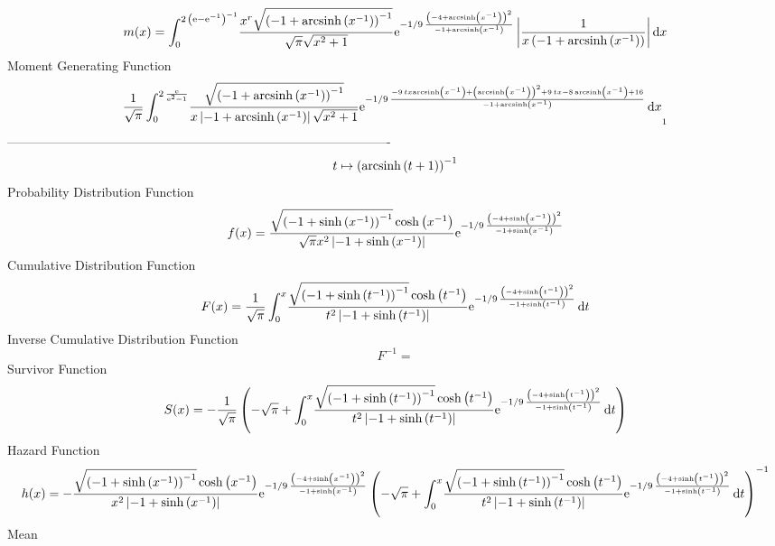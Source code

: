 \documentclass[12pt]{article}
\begin{document}
 $$ m(x) = \int_{0}^{2\, \left( {\rm e}-{{\rm e}^{-1}} \right) ^{-1}}\!{\frac {{x
}^{r}\sqrt { \left( -1+{\rm arcsinh} \left({x}^{-1}\right) \right) ^{-
1}}}{\sqrt {\pi}\sqrt {{x}^{2}+1}}{{\rm e}^{-1/9\,{\frac { \left( -4+
{\rm arcsinh} \left({x}^{-1}\right) \right) ^{2}}{-1+{\rm arcsinh} 
\left({x}^{-1}\right)}}}} \left| {\frac {1}{x \left( -1+{\rm arcsinh} 
\left({x}^{-1}\right) \right) }} \right| }\,{\rm d}x
$$ Moment Generating Function 
 $${\frac {1}{\sqrt {\pi}}\int_{0}^{2\,{\frac {{\rm e}}{{{\rm e}^{2}}-1}}
}\!{\frac {\sqrt { \left( -1+{\rm arcsinh} \left({x}^{-1}\right)
 \right) ^{-1}}}{x \left| -1+{\rm arcsinh} \left({x}^{-1}\right)
 \right| \sqrt {{x}^{2}+1}}{{\rm e}^{-1/9\,{\frac {-9\,tx{\rm arcsinh}
 \left({x}^{-1}\right)+ \left( {\rm arcsinh} \left({x}^{-1}\right)
 \right) ^{2}+9\,tx-8\,{\rm arcsinh} \left({x}^{-1}\right)+16}{-1+
{\rm arcsinh} \left({x}^{-1}\right)}}}}}\,{\rm d}x}_{{1}}
$$-------------------------------------------------------------------------------------------  \\$$t\mapsto  \left( {\rm arcsinh} \left(t+1\right) \right) ^{-1}
$$Probability Distribution Function 
$$  f(x)={\frac {\sqrt { \left( -1+\sinh \left( {x}^{-1} \right)  \right) ^{-1}
}\cosh \left( {x}^{-1} \right) }{\sqrt {\pi}{x}^{2} \left| -1+\sinh
 \left( {x}^{-1} \right)  \right| }{{\rm e}^{-1/9\,{\frac { \left( -4+
\sinh \left( {x}^{-1} \right)  \right) ^{2}}{-1+\sinh \left( {x}^{-1}
 \right) }}}}}
$$Cumulative Distribution Function  
 $$F(x)={\frac {1}{\sqrt {\pi}}\int_{0}^{x}\!{\frac {\sqrt { \left( -1+\sinh
 \left( {t}^{-1} \right)  \right) ^{-1}}\cosh \left( {t}^{-1} \right) 
}{{t}^{2} \left| -1+\sinh \left( {t}^{-1} \right)  \right| }{{\rm e}^{
-1/9\,{\frac { \left( -4+\sinh \left( {t}^{-1} \right)  \right) ^{2}}{
-1+\sinh \left( {t}^{-1} \right) }}}}}\,{\rm d}t}
$$ Inverse Cumulative Distribution Function 
  $$F^{-1} = $$Survivor Function 
 $$ S(x)=-{\frac {1}{\sqrt {\pi}} \left( -\sqrt {\pi}+\int_{0}^{x}\!{\frac {
\sqrt { \left( -1+\sinh \left( {t}^{-1} \right)  \right) ^{-1}}\cosh
 \left( {t}^{-1} \right) }{{t}^{2} \left| -1+\sinh \left( {t}^{-1}
 \right)  \right| }{{\rm e}^{-1/9\,{\frac { \left( -4+\sinh \left( {t}
^{-1} \right)  \right) ^{2}}{-1+\sinh \left( {t}^{-1} \right) }}}}}
\,{\rm d}t \right) }
$$ Hazard Function 
 $$ h(x)=-{\frac {\sqrt { \left( -1+\sinh \left( {x}^{-1} \right)  \right) ^{-1
}}\cosh \left( {x}^{-1} \right) }{{x}^{2} \left| -1+\sinh \left( {x}^{
-1} \right)  \right| }{{\rm e}^{-1/9\,{\frac { \left( -4+\sinh \left( 
{x}^{-1} \right)  \right) ^{2}}{-1+\sinh \left( {x}^{-1} \right) }}}}
 \left( -\sqrt {\pi}+\int_{0}^{x}\!{\frac {\sqrt { \left( -1+\sinh
 \left( {t}^{-1} \right)  \right) ^{-1}}\cosh \left( {t}^{-1} \right) 
}{{t}^{2} \left| -1+\sinh \left( {t}^{-1} \right)  \right| }{{\rm e}^{
-1/9\,{\frac { \left( -4+\sinh \left( {t}^{-1} \right)  \right) ^{2}}{
-1+\sinh \left( {t}^{-1} \right) }}}}}\,{\rm d}t \right) ^{-1}}
$$Mean 
\end{document}
